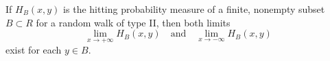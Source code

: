 If \(H_B(x,y)\) is the hitting probability measure of a finite, nonempty subset \(B \subset R\) for a random walk of type II, then both limits
\[
\lim_{x \to +\infty} H_B(x,y) \quad \text{and} \quad \lim_{x \to -\infty} H_B(x,y)
\]
exist for each \(y \in B\).
